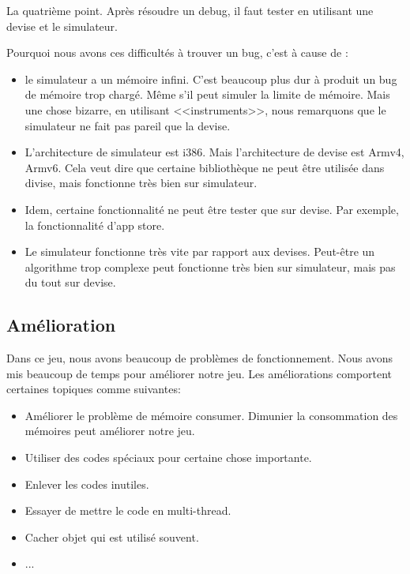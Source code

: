 La quatrième point. Après résoudre un debug, il faut tester en utilisant une devise et le simulateur. 

Pourquoi nous avons ces difficultés à trouver un bug, c'est à cause de :

\begin{itemize}
	\item le simulateur a un mémoire infini. C'est beaucoup plus dur à produit un bug de mémoire trop chargé. Même s'il peut simuler la limite de mémoire. Mais une chose bizarre, en utilisant <<instruments>>, nous remarquons que le simulateur ne fait pas pareil que la devise. 
	\item L'architecture de simulateur est i386. Mais l'architecture de devise est Armv4, Armv6. Cela veut dire que certaine bibliothèque ne peut être utilisée dans divise, mais fonctionne très bien sur simulateur.
	\item Idem, certaine fonctionnalité ne peut être tester que sur devise. Par exemple, la fonctionnalité d'app store. 
	\item Le simulateur fonctionne très vite par rapport aux devises. Peut-être un algorithme trop complexe peut fonctionne très bien sur simulateur, mais pas du tout sur devise. 
\end{itemize}


\subsection{Amélioration} %
\label{sub:amélioration}

Dans ce jeu, nous avons beaucoup de problèmes de fonctionnement. Nous avons mis beaucoup de temps pour améliorer notre jeu. Les améliorations comportent certaines topiques comme suivantes:

\begin{itemize}
	\item Améliorer le problème de mémoire consumer. Dimunier la consommation des mémoires peut améliorer notre jeu. 
	\item Utiliser des codes spéciaux pour certaine chose importante.
	\item Enlever les codes inutiles.
	\item Essayer de mettre le code en multi-thread.
	\item Cacher objet qui est utilisé souvent.
	\item ...
\end{itemize}

